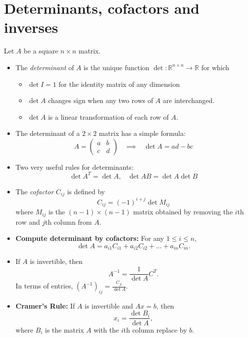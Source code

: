 \documentclass[11pt]{article}
\begin{document}
\section{Determinants, cofactors and inverses}
Let $A$ be a square $n\times n$ matrix.
\begin{itemize}
\item The \emph{determinant} of $A$ is the unique function $\det : \mathbb{R}^{n\times n} \to \mathbb{R}$ for which
\begin{itemize}
\item $\det I = 1$ for the identity matrix of any dimension
\item $\det A$ changes sign when any two rows of $A$ are interchanged.
\item $\det A$ is a linear transformation of each row of $A$.
\end{itemize}
\item The determinant of a $2\times 2$ matrix has a simple formula:
$$\boxed{A = \begin{pmatrix} a & b \\ c & d \end{pmatrix} \;\;\; \implies \;\;\; \det A = ad-bc}$$
\item Two very useful rules for determinants:
$$\boxed{\det A^T = \det A, \;\;\; \det AB = \det A \det B}$$
\item The \emph{cofactor} $C_{ij}$ is defined by
$$\boxed{C_{ij} = (-1)^{i+j} \det M_{ij}}$$
where $M_{ij}$ is the $(n - 1) \times (n - 1)$ matrix obtained by removing the $i$th row and $j$th column from $A$.
\item \textbf{Compute determinant by cofactors:} For any $1 \leq i \leq n$, 
$$\boxed{\det A=a_{i1}C_{i1} +a_{i2}C_{i2} + ... +a_{in}C_{in}.}$$
\item If $A$ is invertible, then
$$\boxed{A^{-1}= \frac{1}{\det A} C^T.}$$
In terms of entries, $(A^{-1})_{ij} = \frac{C_{ji}}{ \det A}$.
\item \textbf{Cramer's Rule:} If $A$ is invertible and $Ax = b$, then
$$\boxed{x_i = \frac{\det B_i}{ \det A},}$$
where $B_i$ is the matrix $A$ with the $i$th column replace by $b$. 
\end{itemize}
\end{document}
